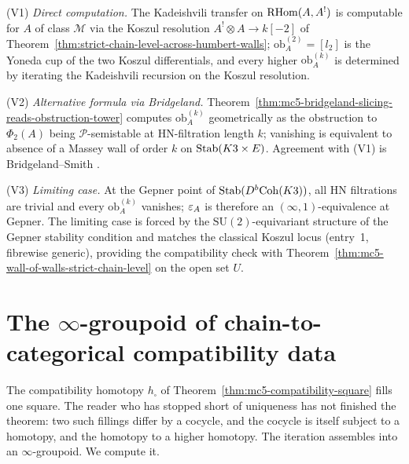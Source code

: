 \begin{remark}
\label{rem:mc5-infty-one-three-paths}
%
\textup{(V1)} \emph{Direct computation.} The Kadeishvili transfer
on $\mathrm{RHom}(A,A^!)$ is computable for $A$ of class $\mathcal M$ via
the Koszul resolution $A^!\otimes A\to k[-2]$ of
Theorem~\textup{\ref{thm:strict-chain-level-across-humbert-walls}};
$\mathrm{ob}^{(2)}_A = [l_2]$ is the Yoneda cup of the two Koszul
differentials, and every higher $\mathrm{ob}^{(k)}_A$ is determined
by iterating the Kadeishvili recursion on the Koszul resolution.

\textup{(V2)} \emph{Alternative formula via Bridgeland.}
Theorem~\textup{\ref{thm:mc5-bridgeland-slicing-reads-obstruction-tower}}
computes $\mathrm{ob}^{(k)}_A$ geometrically as the obstruction to
$\Phi_2(A)$ being $\mathcal P$-semistable at HN-filtration length
$k$; vanishing is equivalent to absence of a Massey wall of order
$k$ on $\mathrm{Stab}(K3\times E)$. Agreement with (V1) is
Bridgeland--Smith \cite[Theorem~1.1]{BridgelandSmith2015InventMath}.

\textup{(V3)} \emph{Limiting case.} At the Gepner point of
$\mathrm{Stab}(D^b\mathrm{Coh}(K3))$, all HN filtrations are trivial and
every $\mathrm{ob}^{(k)}_A$ vanishes; $\varepsilon_A$ is therefore an
$(\infty,1)$-equivalence at Gepner. The limiting case is forced by
the $\mathrm{SU}(2)$-equivariant structure of the Gepner stability
condition and matches the classical Koszul locus (entry~1,
fibrewise generic), providing the compatibility check with
Theorem~\textup{\ref{thm:mc5-wall-of-walls-strict-chain-level}} on
the open set $U$.
\end{remark}

\section{The \texorpdfstring{$\infty$}{infty}-groupoid of chain-to-categorical
 compatibility data}
\label{sec:mc5clmp-compat-data-groupoid}

The compatibility homotopy $h_\square$ of
Theorem~\textup{\ref{thm:mc5-compatibility-square}} fills one square. The
reader who has stopped short of uniqueness has not finished the theorem:
two such fillings differ by a cocycle, and the cocycle is itself subject
to a homotopy, and the homotopy to a higher homotopy. The iteration
assembles into an $\infty$-groupoid. We compute it.

